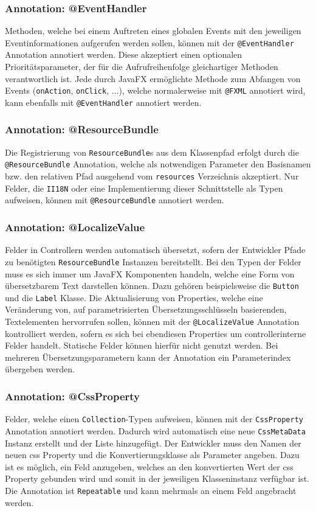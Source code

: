 \subsubsection{Annotation: @EventHandler}
Methoden, welche bei einem Auftreten eines globalen Events mit den jeweiligen Eventinformationen aufgerufen werden sollen, können mit der \texttt{@EventHandler} Annotation annotiert werden. Diese akzeptiert einen optionalen Prioritätsparameter, der für die Aufrufreihenfolge gleichartiger Methoden verantwortlich ist. Jede durch JavaFX ermöglichte Methode zum Abfangen von Events (\texttt{onAction}, \texttt{onClick}, ...), welche normalerweise mit \texttt{@FXML} annotiert wird, kann ebenfalls mit \texttt{@EventHandler} annotiert werden.
\subsubsection{Annotation: @ResourceBundle}
Die Registrierung von \texttt{ResourceBundle}s aus dem Klassenpfad erfolgt durch die \texttt{@ResourceBundle} Annotation, welche als notwendigen Parameter den Basisnamen bzw. den relativen Pfad ausgehend vom \texttt{resources} Verzeichnis akzeptiert. Nur Felder, die \texttt{II18N} oder eine Implementierung dieser Schnittstelle als Typen aufweisen, können mit \texttt{@ResourceBundle} annotiert werden.
\subsubsection{Annotation: @LocalizeValue}
Felder in Controllern werden automatisch übersetzt, sofern der Entwickler Pfade zu benötigten \texttt{ResourceBundle} Instanzen bereitstellt. Bei den Typen der Felder muss es sich immer um JavaFX Komponenten handeln, welche eine Form von übersetzbarem Text darstellen können. Dazu gehören beispielsweise die \texttt{Button} und die \texttt{Label} Klasse. Die Aktualisierung von Properties, welche eine Veränderung von, auf parametrisierten Übersetzungsschlüsseln basierenden, Textelementen hervorrufen sollen, können mit der \texttt{@LocalizeValue} Annotation kontrolliert werden, sofern es sich bei ebendiesen Properties um controllerinterne Felder handelt. Statische Felder können hierfür nicht genutzt werden. Bei mehreren Übersetzungsparametern kann der Annotation ein Parameterindex übergeben werden.
\subsubsection{Annotation: @CssProperty}
Felder, welche einen \texttt{Collection}-Typen aufweisen, können mit der \texttt{CssProperty} Annotation annotiert werden. Dadurch wird automatisch eine neue \texttt{CssMetaData} Instanz erstellt und der Liste hinzugefügt. Der Entwickler muss den Namen der neuen \ac{css} Property und die Konvertierungsklasse als Parameter angeben. Dazu ist es möglich, ein Feld anzugeben, welches an den konvertierten Wert der \ac{css} Property gebunden wird und somit in der jeweiligen Klasseninstanz verfügbar ist. Die Annotation ist \texttt{Repeatable} und kann mehrmals an einem Feld angebracht werden.
